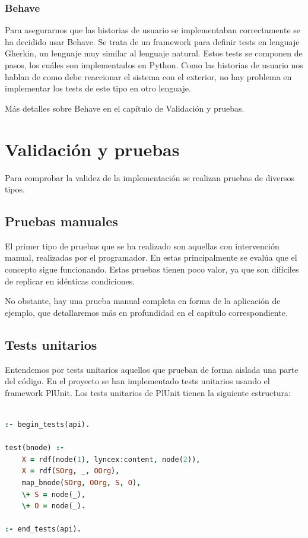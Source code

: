 \documentclass[12pt]{report} %
\begin{document}
\subsection{Behave}
Para asegurarnos que las historias de usuario se implementaban correctamente se ha decidido usar Behave.
Se trata de un framework para definir tests en lenguaje Gherkin, un lenguaje muy similar al lenguaje natural. Estos tests se componen de pasos,
los cuáles son implementados en Python. Como las historias de usuario nos hablan de como debe reaccionar el sistema con el exterior, no hay problema en implementar los tests de este tipo en otro lenguaje.

Más detalles sobre Behave en el capítulo de Validación y pruebas.


\chapter{Validación y pruebas}

Para comprobar la validez de la implementación se realizan pruebas de diversos tipos.

\section{Pruebas manuales}

El primer tipo de pruebas que se ha realizado son aquellas con intervención manual, realizadas por el programador. En estas principalmente se evalúa que el concepto sigue funcionando. Estas pruebas tienen poco valor, ya que son difíciles de replicar en idénticas condiciones.

No obstante, hay una prueba manual completa en forma de la aplicación de ejemplo, que detallaremos más en profundidad en el capítulo correspondiente.

\section{Tests unitarios}

Entendemos por tests unitarios aquellos que prueban de forma aislada una parte del código. En el proyecto se han implementado tests unitarios usando el framework PlUnit. Los tests unitarios de PlUnit tienen la siguiente estructura:

\begin{lstlisting}[language=Prolog]

:- begin_tests(api).

test(bnode) :-
    X = rdf(node(1), lyncex:content, node(2)),
    X = rdf(SOrg, _, OOrg),
    map_bnode(SOrg, OOrg, S, O),
    \+ S = node(_),
    \+ O = node(_).

:- end_tests(api).

\end{lstlisting}
\end{document}
